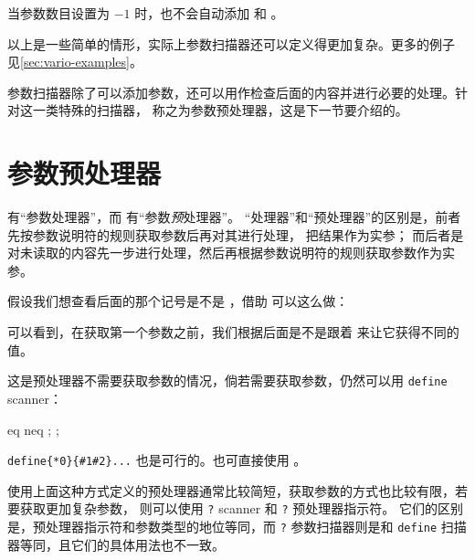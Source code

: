 \documentclass[openany]{book}
\newcounter{example}
\begin{document}
当参数数目设置为 $-1$ 时，也不会自动添加  和 
。

以上是一些简单的情形，实际上参数扫描器还可以定义得更加复杂。更多的例子
见\cref{sec:vario-examples}。

参数扫描器除了可以添加参数，还可以用作检查后面的内容并进行必要的处理。针对这一类特殊的扫描器，
称之为参数预处理器，这是下一节要介绍的。

\section{参数预处理器}

 有“参数处理器”，而  有“参数\emph{预}处理器”。
“处理器”和“预处理器”的区别是，前者先按参数说明符的规则获取参数后再对其进行处理，
把结果作为实参；
而后者是对未读取的内容先一步进行处理，然后再根据参数说明符的规则获取参数作为实参。

假设我们想查看后面的那个记号是不是 ，借助 
 可以这么做：
可以看到，在获取第一个参数之前，我们根据后面是不是跟着  来让它获得不同的值。

这是预处理器不需要获取参数的情况，倘若需要获取参数，仍然可以用 \texttt{define} scanner：
\begin{examcode}[l3code]{}
\ExplSyntaxOn
\DeclareEKeysCommand {} {  { eq } { neq } }
\ExplSyntaxOff
{}; ;
\end{examcode}
\verb|define{*0}{#1#2}...| 也是可行的。也可直接使用 。

使用上面这种方式定义的预处理器通常比较简短，获取参数的方式也比较有限，若要获取更加复杂参数，
则可以使用 \texttt? scanner 和 \texttt? 预处理器指示符。
它们的区别是，预处理器指示符和参数类型的地位等同，而 \texttt? 参数扫描器则是和 \texttt{define}
扫描器等同，且它们的具体用法也不一致。
\end{document}
